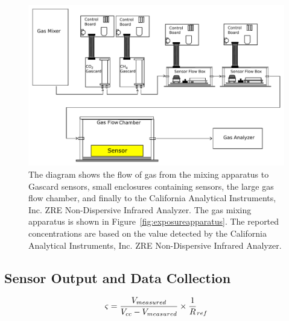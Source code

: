 \documentclass[sensors,article,submit,moreauthors,pdftex]{Definitions/mdpi}
\begin{document}
			
			\begin{figure}[!t]
				\centering
				\includegraphics[width=\columnwidth]{honey2.pdf}
				\caption{The diagram shows the flow of gas from the mixing apparatus to Gascard sensors, small enclosures containing sensors, the large gas flow chamber, and finally to the California Analytical Instruments, Inc. ZRE Non-Dispersive Infrared Analyzer.
				The gas mixing apparatus is shown in Figure~\ref{fig:exposureapparatus}.
				The reported concentrations are based on the value detected by the California Analytical Instruments, Inc. ZRE Non-Dispersive Infrared Analyzer.}
				\label{fig:exposureapparatus2}
			\end{figure}
			
		\subsection{Sensor Output and Data Collection}
		\label{sec:method_data}
		
			\begin{equation}
				\label{eq:vtos}
				\varsigma = \frac{V_{measured}}{V_{cc}-V_{measured}}\times \frac{1}R_{ref}\\
			\end{equation}
			
\end{document}
